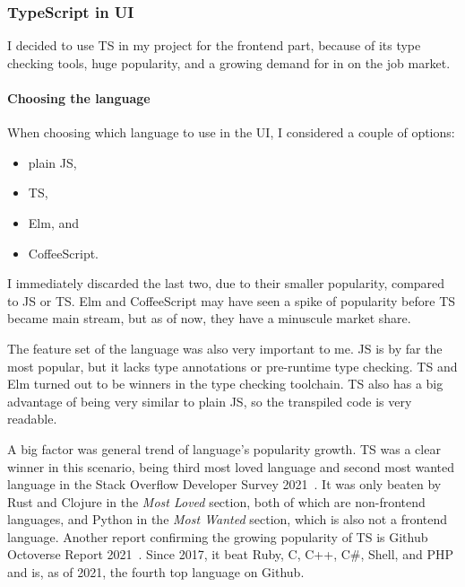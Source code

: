 \subsubsection{TypeScript in UI}\label{sec:typescript-in-ui}

I decided to use \acl{TS} in my project for the frontend part,
because of its type checking tools,
huge popularity,
and a growing demand for in on the job market.

\paragraph*{Choosing the language}\label{sec:choosing-the-language}

When choosing which language to use in the \ac{UI},
I considered a couple of options:

\begin{itemize}
  \item
        plain \acl{JS},
  \item
        \acl{TS},
  \item
        Elm, and
  \item
        CoffeeScript.
\end{itemize}

I immediately discarded the last two,
due to their smaller popularity,
compared to \acl{JS} or \acl{TS}.
Elm and CoffeeScript may have seen
a spike of popularity before \acl{TS}
became main stream,
but as of now, they have a minuscule market share.

The feature set of the language was also very important to me.
\Acl{JS} is by far the most popular,
but it lacks type annotations or pre-runtime type checking.
\Acl{TS} and Elm turned out to be winners in the type checking toolchain.
\Acl{TS} also has a big advantage of being very similar to plain \acl{JS},
so the transpiled code is very readable.

A big factor was general trend of language's popularity growth.
\Acl{TS} was a clear winner in this scenario,
being third most loved language
and second most wanted language
in the Stack Overflow Developer Survey 2021~\cite{stack_overflow_2021_2021}.
It was only beaten by Rust and Clojure
in the \textit{Most Loved} section,
both of which are non-frontend languages,
and Python in the \textit{Most Wanted} section,
which is also not a frontend language.
Another report confirming the growing popularity of \acl{TS}
is Github Octoverse Report 2021~\cite{github_inc_2021_2021}.
Since 2017,
it beat
Ruby,
C,
C++,
C\#,
Shell, and
\ac{PHP}
and is, as of 2021, the fourth top language on Github.

